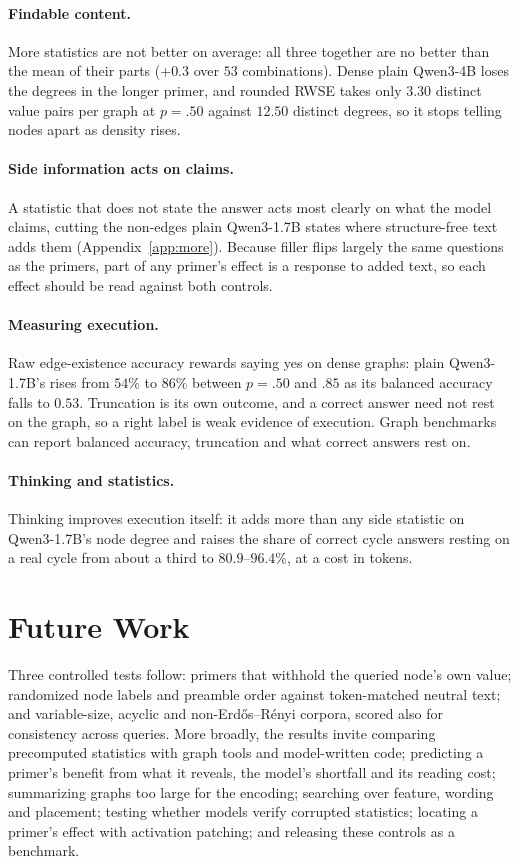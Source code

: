 \documentclass[11pt]{article}
\begin{document}
\paragraph{Findable content.} More statistics are not better on average: all three together are no better than the mean of their parts ($+0.3$ over $53$ combinations). %
Dense plain Qwen3-4B loses the degrees in the longer primer, and rounded RWSE takes only $3.30$ distinct value pairs per graph at $p=.50$ against $12.50$ distinct degrees, so it stops telling nodes apart as density rises. %

\paragraph{Side information acts on claims.} A statistic that does not state the answer acts most clearly on what the model claims, cutting the non-edges plain Qwen3-1.7B states where structure-free text adds them (Appendix~\ref{app:more}). Because filler flips largely the same questions as the primers, part of any primer's effect is a response to added text, so each effect should be read against both controls.

\paragraph{Measuring execution.} Raw edge-existence accuracy rewards saying yes on dense graphs: plain Qwen3-1.7B's rises from $54\%$ to $86\%$ between $p=.50$ and $.85$ as its balanced accuracy falls to $0.53$. %
Truncation is its own outcome, and a correct answer need not rest on the graph, so a right label is weak evidence of execution. Graph benchmarks can report balanced accuracy, truncation and what correct answers rest on.

\paragraph{Thinking and statistics.} Thinking improves execution itself: it adds more than any side statistic on Qwen3-1.7B's node degree and raises the share of correct cycle answers resting on a real cycle from about a third to $80.9$--$96.4\%$, at a cost in tokens. %

\section{Future Work}
\label{sec:future}
Three controlled tests follow: primers that withhold the queried node's own value; randomized node labels and preamble order against token-matched neutral text; and variable-size, acyclic and non-Erd\H{o}s--R\'enyi corpora, scored also for consistency across queries. More broadly, the results invite comparing precomputed statistics with graph tools and model-written code; predicting a primer's benefit from what it reveals, the model's shortfall and its reading cost; summarizing graphs too large for the encoding; searching over feature, wording and placement; testing whether models verify corrupted statistics; locating a primer's effect with activation patching; and releasing these controls as a benchmark.
\end{document}
